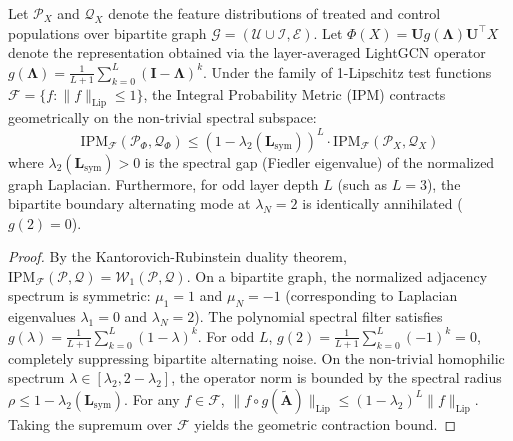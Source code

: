 \documentclass[preprint,12pt,3p]{elsarticle}
\begin{document}
\begin{lemma}
\label{lem:ipm_contraction}
Let $\mathcal{P}_X$ and $\mathcal{Q}_X$ denote the feature distributions of treated and control populations over bipartite graph $\mathcal{G} = (\mathcal{U} \cup \mathcal{I}, \mathcal{E})$. Let $\Phi(X) = \mathbf{U} g(\mathbf{\Lambda}) \mathbf{U}^\top X$ denote the representation obtained via the layer-averaged LightGCN operator $g(\mathbf{\Lambda}) = \frac{1}{L+1} \sum_{k=0}^L (\mathbf{I} - \mathbf{\Lambda})^k$. Under the family of 1-Lipschitz test functions $\mathcal{F} = \{f : \|f\|_{\mathrm{Lip}} \le 1\}$, the Integral Probability Metric (IPM) contracts geometrically on the non-trivial spectral subspace:
\begin{equation}
\mathrm{IPM}_{\mathcal{F}}(\mathcal{P}_{\Phi}, \mathcal{Q}_{\Phi}) \le (1 - \lambda_2(\mathbf{L}_{\mathrm{sym}}))^L \cdot \mathrm{IPM}_{\mathcal{F}}(\mathcal{P}_X, \mathcal{Q}_X)
\end{equation}
where $\lambda_2(\mathbf{L}_{\mathrm{sym}}) > 0$ is the spectral gap (Fiedler eigenvalue) of the normalized graph Laplacian. Furthermore, for odd layer depth $L$ (such as $L=3$), the bipartite boundary alternating mode at $\lambda_N = 2$ is identically annihilated ($g(2) = 0$).
\end{lemma}
\begin{proof}
By the Kantorovich-Rubinstein duality theorem, $\mathrm{IPM}_{\mathcal{F}}(\mathcal{P}, \mathcal{Q}) = \mathcal{W}_1(\mathcal{P}, \mathcal{Q})$. On a bipartite graph, the normalized adjacency spectrum is symmetric: $\mu_1 = 1$ and $\mu_N = -1$ (corresponding to Laplacian eigenvalues $\lambda_1 = 0$ and $\lambda_N = 2$). The polynomial spectral filter satisfies $g(\lambda) = \frac{1}{L+1}\sum_{k=0}^L (1 - \lambda)^k$. For odd $L$, $g(2) = \frac{1}{L+1}\sum_{k=0}^L (-1)^k = 0$, completely suppressing bipartite alternating noise. On the non-trivial homophilic spectrum $\lambda \in [\lambda_2, 2 - \lambda_2]$, the operator norm is bounded by the spectral radius $\rho \le 1 - \lambda_2(\mathbf{L}_{\mathrm{sym}})$. For any $f \in \mathcal{F}$, $\|f \circ g(\tilde{\mathbf{A}})\|_{\mathrm{Lip}} \le (1 - \lambda_2)^L \|f\|_{\mathrm{Lip}}$. Taking the supremum over $\mathcal{F}$ yields the geometric contraction bound.
\end{proof}
\end{document}
